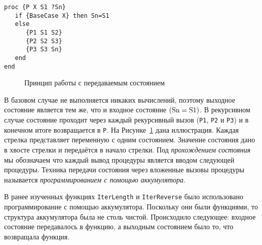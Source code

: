 \begin{lstlisting}
proc {P X S1 ?Sn}
   if {BaseCase X} then Sn=S1
   else
      {P1 S1 S2}
      {P2 S2 S3}
      {P3 S3 Sn}
   end
end
\end{lstlisting}

\begin{figure}
  \caption{Принцип работы с передаваемым состоянием}
  \label{figure:Threaded_state_flow}
\end{figure}

В базовом случае не выполняется никаких вычислений, поэтому выходное состояние является тем же, что и входное состояние $(\text{\lstinline!Sn!}=\text{\lstinline!S1!})$. В рекурсивном случае состояние проходит через каждый рекурсивный вызов (\lstinline!P1!, \lstinline!P2! и \lstinline!P3!) и в конечном итоге возвращается в \lstinline!P!. На Рисунке~\ref{figure:Threaded_state_flow} дана иллюстрация. Каждая стрелка представляет переменную с одним состоянием. Значение состояния дано в хвосте стрелки и передаётся в начало стрелки. Под \emph{прохождением состояния} мы обозначаем что каждый вывод процедуры является вводом следующей процедуры. Техника передачи состояния через вложенные вызовы процедуры называется \emph{программированием с помощью аккумулятора}.

В ранее изученных функциях \lstinline!IterLength! и \lstinline!IterReverse! было использовано программирование с помощью аккумулятора. Поскольку они были функциями, то структура аккумулятора была не столь чистой. Происходило следующее: входное состояние передавалось в функцию, а выходным состоянием было то, что возвращала функция.

